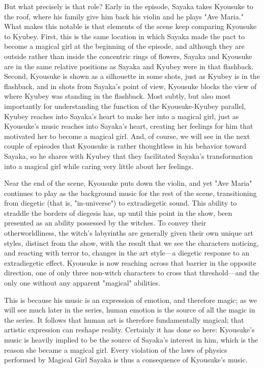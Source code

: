 But what precisely is that role? Early in the episode, Sayaka takes Kyousuke to the roof, where his family give him back his violin and he plays "Ave Maria." What makes this notable is that elements of the scene keep comparing Kyousuke to Kyubey. First, this is the same location in which Sayaka made the pact to become a magical girl at the beginning of the episode, and although they are outside rather than inside the concentric rings of flowers, Sayaka and Kyousuke are in the same relative positions as Sayaka and Kyubey were in that flashback. Second, Kyousuke is shown as a silhouette in some shots, just as Kyubey is in the flashback, and in shots from Sayaka's point of view, Kyousuke blocks the view of where Kyubey was standing in the flashback. Most subtly, but also most importantly for understanding the function of the Kyousuke-Kyubey parallel, Kyubey reaches into Sayaka's heart to make her into a magical girl, just as Kyousuke's music reaches into Sayaka's heart, creating her feelings for him that motivated her to become a magical girl. And, of course, we will see in the next couple of episodes that Kyousuke is rather thoughtless in his behavior toward Sayaka, so he shares with Kyubey that they facilitated Sayaka's transformation into a magical girl while caring very little about her feelings.

Near the end of the scene, Kyousuke puts down the violin, and yet "Ave Maria" continues to play as the background music for the rest of the scene, transitioning from diegetic (that is, "in-universe") to extradiegetic sound. This ability to straddle the borders of diegesis has, up until this point in the show, been presented as an ability possessed by the witches. To convey their otherworldliness, the witch's labyrinths are generally given their own unique art styles, distinct from the show, with the result that we see the characters noticing, and reacting with terror to, changes in the art style—a diegetic response to an extradiegetic effect. Kyousuke is now reaching across that barrier in the opposite direction, one of only three non-witch characters to cross that threshold—and the only one without any apparent "magical" abilities.

This is because his music is an expression of emotion, and therefore magic; as we will see much later in the series, human emotion is the source of all the magic in the series. It follows that human art is therefore fundamentally magical; that artistic expression can reshape reality. Certainly it has done so here: Kyousuke's music is heavily implied to be the source of Sayaka's interest in him, which is the reason she became a magical girl. Every violation of the laws of physics performed by Magical Girl Sayaka is thus a consequence of Kyousuke's music.

